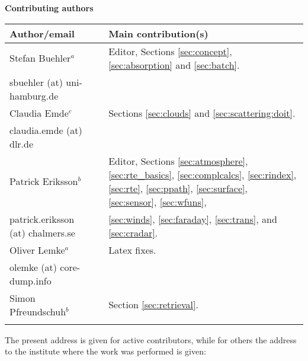 \documentclass[11pt,twoside,a4paper,fleqn]{book}
\begin{document}
%
\newpage
\thispagestyle{plain}
%
\begin{center}
  {\Large \bf Contributing authors}
\end{center}
\vspace*{5mm}
\begin{tabular}{lp{10mm}l}
  \hline
  {\bf Author/email} & & {\bf Main contribution(s)} \\
  \hline
  Stefan Buehler$^a$ & & Editor, Sections \ref{sec:concept},
  \ref{sec:absorption} and \ref{sec:batch}.\\
  sbuehler (at) uni-hamburg.de & &        \\
 \hline
  Claudia Emde$^c$ & & Sections \ref{sec:clouds} and \ref{sec:scattering:doit}.\\
  claudia.emde (at) dlr.de & & \\
  \hline
  Patrick Eriksson$^b$ &  & Editor, 
  Sections \ref{sec:atmosphere}, \ref{sec:rte_basics}, \ref{sec:complcalcs}, 
  \ref{sec:rindex}, \ref{sec:rte}, \ref{sec:ppath}, \ref{sec:surface}, 
  \ref{sec:sensor}, \ref{sec:wfuns}, \\  
  patrick.eriksson (at) chalmers.se & & \ref{sec:winds}, \ref{sec:faraday}, 
  \ref{sec:trans}, 
  and \ref{sec:cradar}. \\
  \hline
  Oliver Lemke$^a$ & & Latex fixes.\\
  olemke (at) core-dump.info & & \\
  \hline
  Simon Pfreundschuh$^b$  & & Section \ref{sec:retrieval}.\\
 \hline
 &&\\
\end{tabular}


\vspace{1ex}\noindent
The present address is given for active contributors, while for others
the address to the institute where the work was performed is given:\\
\end{document}
